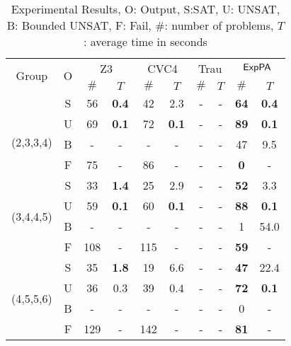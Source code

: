 \vspace*{-3mm}
\begin{table}[ht]
        \caption{Experimental Results, O: Output, S:SAT, U: UNSAT, B: Bounded UNSAT, F: Fail, 
    $\#$: number of problems, $T$: average time in seconds}
    \centering
    \renewcommand{\arraystretch}{1.1}
    \begin{tabular}{|c|c|c|c|c|c|c|c|c|c|}
    \hline
        \multirow{2}{*}{Group }  & \multirow{2}{*}{O} & \multicolumn{2}{c|}{Z3} & \multicolumn{2}{c|}{CVC4} &  \multicolumn{2}{c|}{Trau} & \multicolumn{2}{c|}{${\sf ExpPA}$} \\
        \cline{3-10}
        &  & \scriptsize{$\#$} & \scriptsize{$T$}  & \scriptsize{$\#$} & \scriptsize{$T$}  & \scriptsize{$\#$} & \scriptsize{$T$} & \scriptsize{$\#$} & \scriptsize{$T$}  \\ \hline
        \multirow{4}{*}{
        \newline \scriptsize{(2,3,3,4)}} & S & 56 & {\bf 0.4} & 42 & 2.3 & - & - &  {\bf 64} & {\bf 0.4} \\
        \cline{2-10}
         & U & 69 & {\bf 0.1} & 72 &  {\bf 0.1} & - & - &  {\bf 89} & {\bf 0.1} \\
         \cline{2-10}
         & B & - & - & - & - & - & - &  47 & 9.5 \\
         \cline{2-10}
         & F & 75 & - & 86 & - & - & - &  {\bf 0} & - \\ \hline
         \cline{1-10}
        \multirow{4}{*}{\scriptsize{(3,4,4,5)}} & S & 33 & {\bf 1.4} & 25 & 2.9 & - & - &  {\bf 52} & 3.3 \\
        \cline{2-10}
         & U & 59 & {\bf 0.1} & 60 & {\bf 0.1} & - & - &  {\bf 88} & {\bf 0.1} \\
         \cline{2-10}
         & B & -  & - &  - & -  & - & - &  1 & 54.0 \\
         \cline{2-10}
         & F & 108 & - & 115 & - & - & - &  {\bf 59} & - \\ \hline
         \cline{1-10}
        \multirow{4}{*}{\scriptsize{(4,5,5,6)}} & S & 35 & {\bf 1.8} & 19 & 6.6 & - & - &  {\bf 47} & 22.4 \\
        \cline{2-10}
         & U & 36 & 0.3 & 39 & 0.4 & - & - &  {\bf 72} & {\bf 0.1} \\
         \cline{2-10}
         & B & -  & -  & - & - & - & - &  0 & - \\
         \cline{2-10}
         & F & 129 & - & 142 & - & - & - &  {\bf 81} & -\\

\end{tabular}
\end{table}
